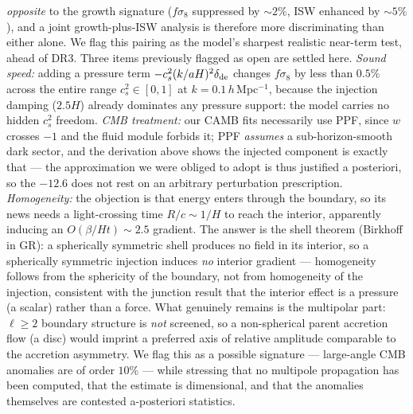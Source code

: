 \documentclass[11pt]{article}
\begin{document}
\emph{opposite} to the growth signature ($f\sigma_8$ suppressed by $\sim 2\%$, ISW enhanced by
$\sim 5\%$), and a joint growth-plus-ISW analysis is therefore more discriminating than either
alone. We flag this pairing as the model's sharpest realistic near-term test, ahead of DR3.
Three items previously flagged as open are settled here. \emph{Sound speed:} adding a pressure
term $-c_s^2(k/aH)^2\delta_{\rm de}$ changes $f\sigma_8$ by less than $0.5\%$ across the entire range
$c_s^2 \in [0,1]$ at $k = 0.1\,h\,$Mpc$^{-1}$, because the injection damping ($2.5H$) already dominates
any pressure support: the model carries no hidden $c_s^2$ freedom. \emph{CMB treatment:} our CAMB fits
necessarily use PPF, since $w$ crosses $-1$ and the fluid module forbids it; PPF \emph{assumes} a
sub-horizon-smooth dark sector, and the derivation above shows the injected component is exactly that
--- the approximation we were obliged to adopt is thus justified a posteriori, so the $-12.6$ does not
rest on an arbitrary perturbation prescription. \emph{Homogeneity:} the objection is that energy
enters through the boundary, so its news needs a light-crossing time $R/c \sim 1/H$ to reach the
interior, apparently inducing an $O(\beta/Ht) \sim 2.5$ gradient. The answer is the shell theorem
(Birkhoff in GR): a spherically symmetric shell produces no field in its interior, so a spherically
symmetric injection induces \emph{no} interior gradient --- homogeneity follows from the sphericity of
the boundary, not from homogeneity of the injection, consistent with the junction result that the
interior effect is a pressure (a scalar) rather than a force. What genuinely remains is the multipolar
part: $\ell \ge 2$ boundary structure is \emph{not} screened, so a non-spherical parent accretion flow
(a disc) would imprint a preferred axis of relative amplitude comparable to the accretion asymmetry.
We flag this as a possible signature --- large-angle CMB anomalies are of order $10\%$ --- while
stressing that no multipole propagation has been computed, that the estimate is dimensional, and that
the anomalies themselves are contested a-posteriori statistics.
\end{document}
